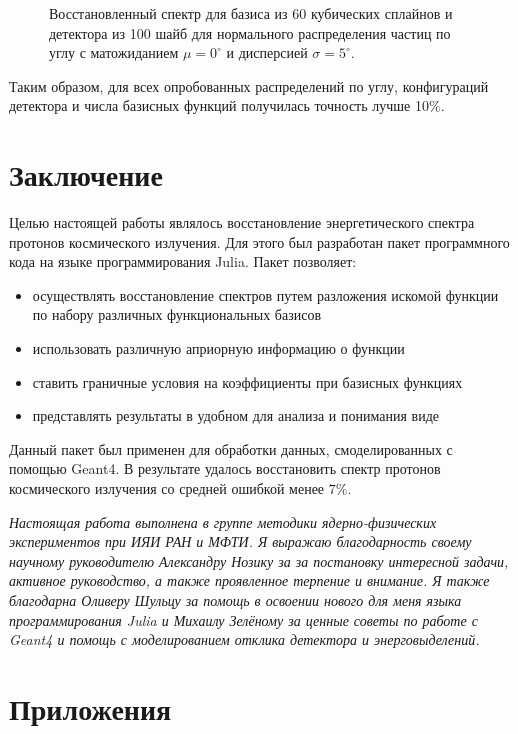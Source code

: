 \documentclass{config}
\begin{document}
\begin{figure}[h]
\begin{minipage}[h]{0.45\linewidth}
    \caption{Восстановленный спектр для базиса из 60 кубических сплайнов и детектора из 100 шайб для нормального распределения частиц по углу с матожиданием $\mu = 0^\circ$ и дисперсией $\sigma = 5^\circ$.}
    \label{gaussian}
\end{minipage}
\end{figure}


Таким образом, для всех опробованных распределений по углу, конфигураций детектора и числа базисных функций получилась точность лучше 10$\%$.



\clearpage

\section{Заключение}
Целью настоящей работы являлось восстановление энергетического спектра протонов космического излучения. Для этого был разработан пакет программного кода на языке программирования Julia. Пакет позволяет:
\begin{itemize}
    \item осуществлять восстановление спектров путем разложения искомой функции по набору различных функциональных базисов
    \item использовать различную априорную информацию о функции
    \item ставить граничные условия на коэффициенты при базисных функциях
    \item представлять результаты в удобном для анализа и понимания виде
\end{itemize}
Данный пакет был применен для обработки данных, смоделированных с помощью Geant4. В результате удалось восстановить спектр протонов космического излучения со средней ошибкой менее $7\%$.

\textit{
Настоящая работа выполнена в группе методики ядерно-физических экспериментов при ИЯИ РАН и МФТИ. Я выражаю благодарность своему научному руководителю Александру Нозику за за постановку интересной задачи, активное руководство, а также проявленное терпение и внимание. Я также благодарна Оливеру Шульцу за помощь в освоении нового для меня языка программирования Julia и Михаилу Зелёному за ценные советы по работе с Geant4 и помощь с моделированием отклика детектора и энерговыделений.}
\clearpage

\section{Приложения}
\end{document}
